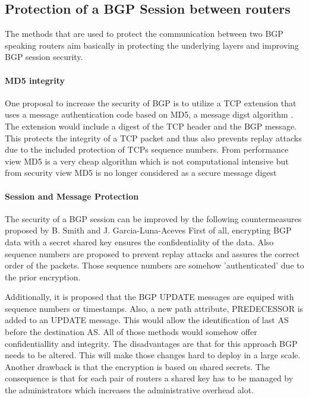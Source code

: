 \documentclass[12pt,a4paper]{IEEEtran}
\begin{document}
	\subsection{Protection of a BGP Session between routers}
		The methods that are used to protect the communication between two BGP speaking routers aim basically in protecting the underlying layers and improving BGP session security.

		\paragraph{MD5 integrity} One proposal to increase the security of BGP is to utilize a TCP extension that uses a message authentication code based on MD5, a message digst algorithm \citep{Metzger1995a}. The extension would include a digest of the TCP header and the BGP message.  This protects the integrity of a TCP packet and thus also prevents replay attacks due to the included protection of TCPs sequence numbers. 
		From performance view MD5 is a very cheap algorithm which is  not computational intensive but from security view MD5 is no longer considered as a secure message digest \citep{Turner2011d}

		\paragraph{Session and Message Protection}
		The security of a BGP session can be improved by the following countermeasures proposed by B. Smith and J. Garcia-Luna-Aceves \citep{Smith1996a}
		First of all, encrypting BGP data with a secret shared key ensures the confidentiality of the data. 
		Also sequence numbers are proposed to prevent replay attacks and assures the correct order of the packets. Those sequence numbers are somehow 'authenticated' due to the prior encryption. 

		Additionally, it is proposed that the BGP UPDATE messages are equiped with sequence numbers or timestamps.
		Also, a new path attribute, PREDECESSOR is added to an UPDATE message. This would allow the identification of last AS before the destination AS. All of those methods would somehow offer confidentiallity and integrity. The disadvantages are that for this approach BGP needs to be altered. This will make those changes hard to deploy in a large scale. Another drawback is that the encryption is based on shared secrets. The consequence is that for each pair of routers a shared key has to be managed by the administrators which increases the administrative overhead alot.
					       
\end{document}
